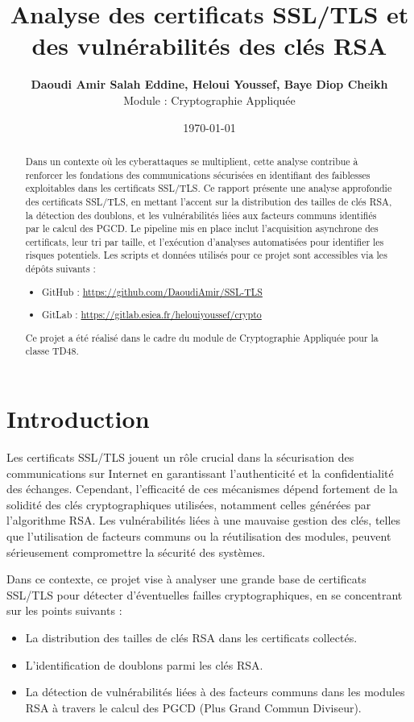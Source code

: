 \documentclass[11pt,a4paper]{article}
\title{\textbf{Analyse des certificats SSL/TLS et des vulnérabilités des clés RSA}}
\author{	\textbf{Daoudi Amir Salah Eddine, Heloui Youssef, Baye Diop Cheikh} \\
Module : Cryptographie Appliquée}
\date{\today}
\begin{document}
\maketitle

\begin{abstract}
Dans un contexte où les cyberattaques se multiplient, cette analyse contribue à renforcer les fondations des communications sécurisées en identifiant des faiblesses exploitables dans les certificats SSL/TLS.
Ce rapport présente une analyse approfondie des certificats SSL/TLS, en mettant l'accent sur la distribution des tailles de clés RSA, la détection des doublons, et les vulnérabilités liées aux facteurs communs identifiés par le calcul des PGCD. Le pipeline mis en place inclut l'acquisition asynchrone des certificats, leur tri par taille, et l'exécution d'analyses automatisées pour identifier les risques potentiels. Les scripts et données utilisés pour ce projet sont accessibles via les dépôts suivants :
\begin{itemize}
    \item GitHub : \url{https://github.com/DaoudiAmir/SSL-TLS}
    \item GitLab : \url{https://gitlab.esiea.fr/helouiyoussef/crypto}
\end{itemize}
Ce projet a été réalisé dans le cadre du module de Cryptographie Appliquée pour la classe TD48.
\end{abstract}


\tableofcontents

\section{Introduction}
Les certificats SSL/TLS jouent un rôle crucial dans la sécurisation des communications sur Internet en garantissant l'authenticité et la confidentialité des échanges. Cependant, l'efficacité de ces mécanismes dépend fortement de la solidité des clés cryptographiques utilisées, notamment celles générées par l'algorithme RSA. Les vulnérabilités liées à une mauvaise gestion des clés, telles que l'utilisation de facteurs communs ou la réutilisation des modules, peuvent sérieusement compromettre la sécurité des systèmes.

Dans ce contexte, ce projet vise à analyser une grande base de certificats SSL/TLS pour détecter d'éventuelles failles cryptographiques, en se concentrant sur les points suivants :
\begin{itemize}
    \item La distribution des tailles de clés RSA dans les certificats collectés.
    \item L'identification de doublons parmi les clés RSA.
    \item La détection de vulnérabilités liées à des facteurs communs dans les modules RSA à travers le calcul des PGCD (Plus Grand Commun Diviseur).
\end{itemize}
\end{document}
